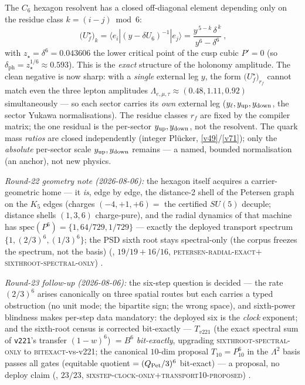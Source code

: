 \begin{winbox}
The $C_6$ hexagon resolvent has a closed off-diagonal element depending only on the residue class
$k=(i{-}j)\bmod 6$:
\[
  \boxed{\ \big(U_f^\star\big)_k=\langle e_i|(y-\delta U_6)^{-1}|e_j\rangle
  =\frac{y^{\,5-k}\,\delta^{\,k}}{y^{6}-\delta^{6}}\ },
\]
with $z_\star=\delta^6=0.043606$ the lower critical point of the cusp cubic $P'{=}0$ (so
$\delta_{\mathrm{ph}}=z_\star^{1/6}\approx0.593$).
This is the \emph{exact} structure of the holonomy amplitude. The clean negative is now sharp: with a
\emph{single} external leg $y$, the form $\big(U_f^\star\big)_{r_f}$ cannot match even the three lepton
amplitudes $\Lambda_{e,\mu,\tau}\approx(0.48,1.11,0.92)$ simultaneously --- so each sector carries its
\emph{own} external leg ($y_\ell,y_{\rm up},y_{\rm down}$, the sector Yukawa normalisations). The residue
classes $r_f$ are fixed by the compiler matrix; the one residual is the per-sector $y_{\rm up},y_{\rm down}$,
not the resolvent. The quark mass \emph{ratios} are closed independently (integer Pl\"ucker, \vref{v49}/\vref{v71}); only
the \emph{absolute} per-sector scale $y_{\rm up},y_{\rm down}$ remains --- a named, bounded normalisation
(an anchor), not new physics. \mO
\par\smallskip\noindent\emph{Round-22 geometry note (2026-08-06):} the hexagon itself acquires a
carrier-geometric home --- it \emph{is}, edge by edge, the distance-2 shell of the Petersen graph
on the $K_5$ edges (charges $(-4,+1,+6)=$ the certified $SU(5)$ decuple; distance shells $(1,3,6)$
charge-pure), and the radial dynamics of that machine has
$\mathrm{spec}(P^6)=\{1,64/729,1/729\}$ --- exactly the deployed transport spectrum
$\{1,(2/3)^6,(1/3)^6\}$; the PSD sixth root stays spectral-only (the corpus freezes the spectrum,
not the basis) (, $19/19+16/16$,
\textsc{petersen-radial-exact}$+$\textsc{sixthroot-spectral-only}) \mE.
\par\smallskip\noindent\emph{Round-23 follow-up (2026-08-06):} the six-step question is decided
--- the rate $(2/3)^6$ arises canonically on three spatial routes but each carries a typed
obstruction (no unit mode; the bipartite sign; the wrong space), and sixth-power blindness makes
per-step data mandatory: the deployed six is the \emph{clock} exponent; and the sixth-root
census is corrected bit-exactly --- $T_{v221}$ (the exact spectral sum of \texttt{v221}'s
transfer $(1-w)^6$) $=B^6$ \emph{bit-exactly}, upgrading \textsc{sixthroot-spectral-only} to
\textsc{bitexact}-vs-v221; the canonical $10$-dim proposal $T_{10}=P_{10}^6$ in the $\Lambda^2$
basis passes all gates (equitable quotient $=(Q_{\rm Pet}/3)^6$ bit-exact) --- a proposal, no
deploy claim (, $23/23$,
\textsc{sixstep-clock-only}$+$\textsc{transport10-proposed}) \mE.
\end{winbox}

